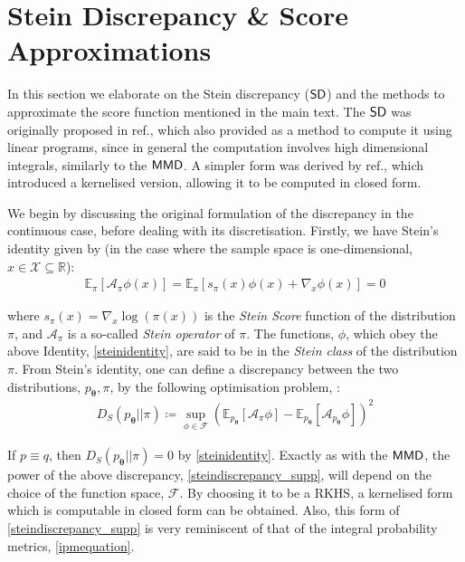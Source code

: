 

\section{Stein Discrepancy \& Score Approximations \label{supp_matt:stein_discrepenancy}}
In this section we elaborate on the Stein discrepancy ($\operatorname{\textsf{SD}}$) and the methods to approximate the score function mentioned in the main text. The $\operatorname{\textsf{SD}}$ was originally proposed in ref., which also provided as a method to compute it using linear programs, since in general the computation involves high dimensional integrals, similarly to the $\operatorname{\textsf{MMD}}$. A simpler form was derived by ref., which introduced a kernelised version, allowing it to be computed in closed form. 

We begin by discussing the original formulation of the discrepancy in the continuous case, before dealing with its discretisation. Firstly, we have Stein's identity given by (in the case where the sample space is one-dimensional, $x\in \mathcal{X} \subseteq \mathbb{R}$):
\begin{align}
    \mathbb{E}_\pi\left[\mathcal{A}_\pi\phi(x)\right] = \mathbb{E}_\pi \left[s_\pi(x)\phi(x)+ \nabla_x\phi(x)\right]  = 0 \label{steinidentity}
\end{align}

where $s_\pi(x) = \nabla_x\log(\pi(x))$ is the \textit{Stein Score} function of the distribution $\pi$, and $\mathcal{A}_\pi$ is a so-called \textit{Stein operator} of $\pi$. The functions, $\phi$, which obey the above Identity, \eqref{steinidentity}, are said to be in the \textit{Stein class} of the distribution $\pi$. From Stein's identity, one can  define a discrepancy  between the two distributions, $p_{\boldsymbol\theta}, \pi$, by the following optimisation problem, :
\begin{align}
    D_S(p_{\boldsymbol\theta}|| \pi)  \coloneqq \sup_{\phi \in \mathcal{F}}\left(\mathbb{E}_{p_{\boldsymbol\theta}}[\mathcal{A}_\pi\phi] - \mathbb{E}_{p_{\boldsymbol\theta}}[\mathcal{A}_{p_{\boldsymbol\theta}}\phi]\right)^2 \label{steindiscrepancy_supp}
\end{align}

If $p\equiv q$, then $D_S(p_{\boldsymbol\theta}|| \pi) = 0$ by \eqref{steinidentity}. Exactly as with the $\operatorname{\textsf{MMD}}$, the power of the above discrepancy, \eqref{steindiscrepancy_supp}, will depend on the choice of the function space, $\mathcal{F}$. By choosing it to be a RKHS, a kernelised form which is computable in closed form can be obtained. Also, this form of \eqref{steindiscrepancy_supp} is very reminiscent of that of the integral probability metrics, \eqref{ipmequation}.

